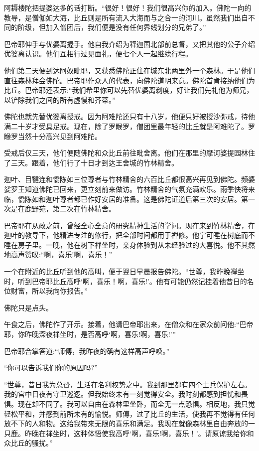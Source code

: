 \documentclass[12pt,twoside,openany]{book}
\begin{document}
阿耨楼陀把提婆达多的话打断。“很好！很好！我们很高兴你的加入。佛陀一向的教导，是僧伽如大海，比丘则是所有流入大海而与之合一的河川。虽然我们出自不同的阶级，但加入僧团后，我们便是没有任何界线划分的兄弟了。”

巴帝耶伸手与优婆离握手。他自我介绍为释迦国北部前总督，又把其他的公子介绍优婆离认识。他们互相行过见面礼，便七个人一起继续行程。

他们第二天便到达阿奴毗耶，又获悉佛陀正住在城东北两里外一个森林。于是他们直往森林拜会佛陀。巴帝耶作众人的代表，向佛陀道明来意。佛陀首肯接纳他们为比丘。巴帝耶还表示:“我们希里你可以先替优婆离剃度，好让我们先礼他为师兄，以铲除我们之间的所有虚慢和芥蒂。”

佛陀也就先替优婆离授戒。因为阿难陀还只有十八岁，他便只好被授沙弥戒，待他满二十岁才受具足戒。现在，除了罗睺罗，僧团里最年轻的比丘就是阿难陀了。罗睺罗当然十分高兴见到阿难陀。

受戒后仅三天，他们便随佛陀和众比丘前往毗舍离。他们在那里的摩诃婆提园林住了三天。跟着，他们行了十日才到达王舍城的竹林精舍。

迦叶、目犍连和憍陈如三位尊者与竹林精舍的六百比丘都很高兴再见到佛陀。频婆娑罗王知道佛陀已回来，更立刻前来做访。竹林精舍的气氛充满欢乐。雨季快将来临，憍陈如和迦叶尊者都已作好安居的准备。这是佛陀证道后第三次的安居。第一次是在鹿野苑，第二次在竹林精舍。

巴帝耶在从政之前，曾经全心全意的研究精神生活的学问。现在来到竹林精舍，在迦叶的教导下，他精进专注的修行，把全部时间都用于禅修。他宁可睡在树底而不睡在房子里。一晚，他在树下禅坐时，亲身体验到从未经验过的大喜悦。他不其然地高声赞叹:“啊，喜乐!啊，喜乐！”

一个在附近的比丘听到他的高叫，便于翌日早晨报告佛陀。“世尊，我昨晚禅坐时，听到巴帝耶比丘高呼‘啊，喜乐！啊，喜乐!’。他有可能仍然记挂着他昔日的名位财富，所以我向你报告。”

佛陀只是点头。

午食之后，佛陀作了开示。接着，他请巴帝耶出来，在僧众和在家众前问他:“巴帝耶，你昨晚深夜禅坐时，是否高呼‘啊，喜乐!啊，喜乐!’”

巴帝耶合掌答道:“师傅，我昨夜的确有这样高声呼唤。”

“你可以告诉我们你的原因吗?”

“世尊，昔日我为总督，生活在名利权势之中。我到那里都有四个士兵保护左右。我的宫中日夜有守卫巡逻。但我始终未有一刻觉得安全。我时刻都感到担忧和畏惧。现在却不同了。我可以自由在森林里坐卧，而全无一点恐惧。相反地，我只觉轻松平和，并感到前所未有的愉悦。师傅，过了比丘的生活，使我再不觉得有任何放不下的人和物。这给我带来无限的喜乐和满足。我现在就像森林里自由奔放的一只鹿。昨晚在禅坐时，这种体悟使我高呼‘啊，喜乐!啊，喜乐！’。请原谅我给你和众比丘的骚扰。”
\end{document}
